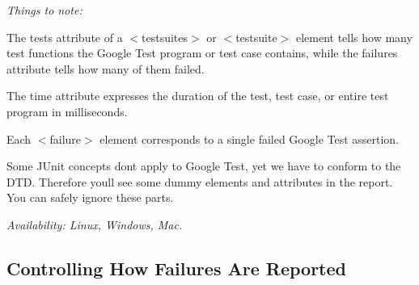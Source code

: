 {\itshape 
\begin{DoxyCode}{0}
\end{DoxyCode}
}

{\itshape Things to note\+:}

{\itshape 
\begin{DoxyItemize}
\item The {\ttfamily tests} attribute of a {\ttfamily $<$testsuites$>$} or {\ttfamily $<$testsuite$>$} element tells how many test functions the Google Test program or test case contains, while the {\ttfamily failures} attribute tells how many of them failed.
\item The {\ttfamily time} attribute expresses the duration of the test, test case, or entire test program in milliseconds.
\item Each {\ttfamily $<$failure$>$} element corresponds to a single failed Google Test assertion.
\item Some J\+Unit concepts don\textquotesingle{}t apply to Google Test, yet we have to conform to the D\+TD. Therefore you\textquotesingle{}ll see some dummy elements and attributes in the report. You can safely ignore these parts.
\end{DoxyItemize}}

{\itshape {\itshape Availability\+:} Linux, Windows, Mac.}

{\itshape \subsection*{Controlling How Failures Are Reported}}

